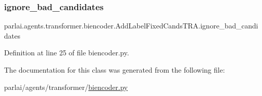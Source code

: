 \subsubsection{\texorpdfstring{ignore\+\_\+bad\+\_\+candidates}{ignore\_bad\_candidates}}
{\footnotesize\ttfamily parlai.\+agents.\+transformer.\+biencoder.\+Add\+Label\+Fixed\+Cands\+T\+R\+A.\+ignore\+\_\+bad\+\_\+candidates}



Definition at line 25 of file biencoder.\+py.



The documentation for this class was generated from the following file\+:\begin{DoxyCompactItemize}
\item 
parlai/agents/transformer/\hyperlink{biencoder_8py}{biencoder.\+py}\end{DoxyCompactItemize}
